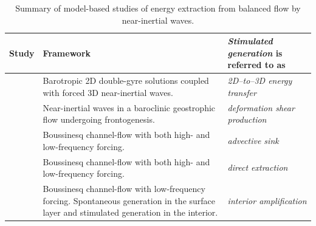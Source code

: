 \documentclass{jfm}
\begin{document}
\begin{table}
\label{modelzTable}
\caption{Summary of model-based studies of energy extraction from balanced flow by near-inertial waves.}
  \begin{center}
     \begin{tabular}{ p{} p{} |   p{}    }
       \hline
         Study &  Framework &   \textit{Stimulated generation} is referred to as \\ \hline
   \cite{gertz_straub2009} & {Barotropic 2D double-gyre solutions coupled with forced 3D
                              near-inertial waves.}
                              & \textit{2D--to--3D energy transfer}
                              \\ \hline
 \cite{thomas_2012} & {Near-inertial waves in a baroclinic geostrophic flow undergoing frontogenesis.}
                              & \textit{deformation shear production}
                              \\ \hline
     \cite{taylor_straub2016} & Boussinesq channel-flow with both  high- and
                                  low-frequency forcing.&
                                  \textit{advective sink}\\ \hline
    \cite{barkan_etal2016} & Boussinesq channel-flow  with both high- and
                                  low-frequency forcing.
                              & \textit{direct extraction}\\ \hline
    \cite{shakespeare_hogg2017} & Boussinesq channel-flow  with
                                  low-frequency forcing. Spontaneous generation in
                                  the surface layer and stimulated generation in
                                  the interior.
                                & \textit{interior amplification}
    \end{tabular}
  \end{center}
\end{table}
\end{document}
